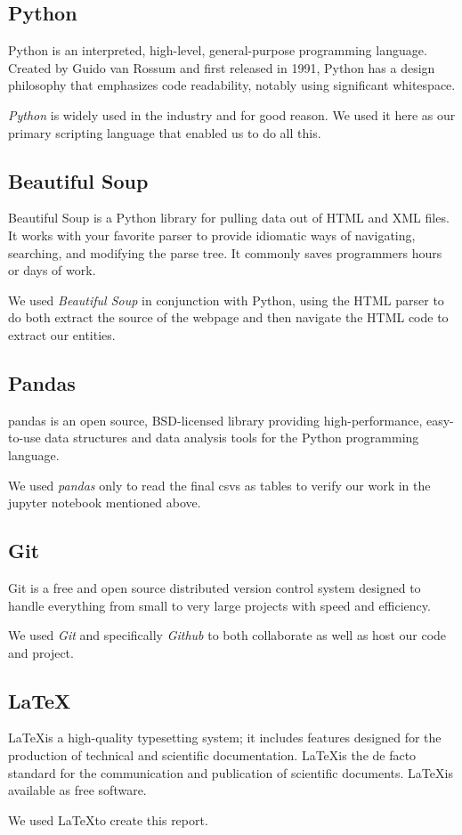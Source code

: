 \documentclass[]{article}
\begin{document}
\subsection{Python}
Python is an interpreted, high-level, general-purpose programming language. Created by Guido van Rossum and first released in 1991, Python has a design philosophy that emphasizes code readability, notably using significant whitespace.

\emph{Python} is widely used in the industry and for good reason. We used it here as our primary scripting language that enabled us to do all this.

\subsection{Beautiful Soup}
Beautiful Soup is a Python library for pulling data out of HTML and XML files. It works with your favorite parser to provide idiomatic ways of navigating, searching, and modifying the parse tree. It commonly saves programmers hours or days of work.

We used \emph{Beautiful Soup} in conjunction with Python, using the HTML parser to do both extract the source of the webpage and then navigate the HTML code to extract our entities.

\subsection{Pandas}
pandas is an open source, BSD-licensed library providing high-performance, easy-to-use data structures and data analysis tools for the Python programming language.

We used \emph{pandas} only to read the final csvs as tables to verify our work in the jupyter notebook mentioned above.

\subsection{Git}
Git is a free and open source distributed version control system designed to handle everything from small to very large projects with speed and efficiency.

We used \emph{Git} and specifically \emph{Github} to both collaborate as well as host our code and project.

\subsection{\LaTeX}
\LaTeX is a high-quality typesetting system; it includes features designed for the production of technical and scientific documentation. \LaTeX is the de facto standard for the communication and publication of scientific documents. \LaTeX is available as free software.

We used \LaTeX to create this report.
\end{document}
